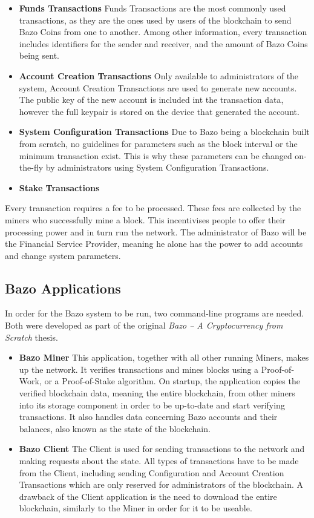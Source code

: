 \begin{itemize}
\item \textbf{Funds Transactions}
Funds Transactions are the most commonly used transactions, as they are the ones used by users of the blockchain to send Bazo Coins from one to another. Among other information, every transaction includes identifiers for the sender and receiver, and the amount of Bazo Coins being sent.
\item \textbf{Account Creation Transactions}
Only available to administrators of the system, Account Creation Transactions are used to generate new accounts. The public key of the new account is included int the transaction data, however the full keypair is stored on the device that generated the account.
\item \textbf{System Configuration Transactions}
Due to Bazo being a blockchain built from scratch, no guidelines for parameters such as the block interval or the minimum transaction exist. This is why these parameters can be changed on-the-fly by administrators using System Configuration Transactions.
\item \textbf{Stake Transactions}
\end{itemize}

Every transaction requires a fee to be processed. These fees are collected by the miners who successfully mine a block. This incentivises people to offer their processing power and in turn run the network. The administrator of Bazo will be the Financial Service Provider, meaning he alone has the power to add accounts and change system parameters.

\subsection{Bazo Applications}
In order for the Bazo system to be run, two command-line programs are needed. Both were developed as part of the original \emph{Bazo -- A Cryptocurrency from Scratch} thesis.

\begin{itemize}
\item \textbf{Bazo Miner}
This application, together with all other running Miners, makes up the network. It verifies transactions and mines blocks using a Proof-of-Work, or a Proof-of-Stake algorithm. On startup, the application copies the verified blockchain data, meaning the entire blockchain, from other miners into its storage component in order to be up-to-date and start verifying transactions. It also handles data concerning Bazo accounts and their balances, also known as the state of the blockchain.

\item \textbf{Bazo Client}
The Client is used for sending transactions to the network and making requests about the state. All types of transactions have to be made from the Client, including sending Configuration and Account Creation Transactions which are only reserved for administrators of the blockchain. A drawback of the Client application is the need to download the entire blockchain, similarly to the Miner in order for it to be useable.
\end{itemize}

